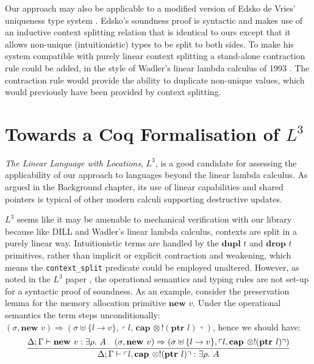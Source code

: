 \documentclass[]{unswthesis}
\newcommand{\Exists}[1]{\exists #1 \ldotp \,}
\newcommand{\types}{\vdash}
\newcommand{\steps}{\Rightarrow}
\newcommand{\ptr}[1]{\textbf{ptr $#1$}}
\newcommand{\capa}[1]{\textbf{cap $#1$}}
\newcommand{\lquine}{\left\ulcorner}
\newcommand{\rquine}{\right\urcorner}
\newcommand{\dupl}[1]{\textbf{dupl $#1$}}
\newcommand{\drop}[1]{\textbf{drop $#1$}}
\newcommand{\lnew}[1]{\textbf{new $#1$}}
\newcommand{\qpair}[2]{\lquine #1, #2 \rquine}
\let\c\texttt
\let\i\textit
\begin{document}
Our approach may also be applicable to a modified version of Edsko de Vries' uniqueness type system \cite{deVries07, deVriesPhD08}. Edsko's soundness proof is syntactic and makes use of an inductive context splitting relation that is identical to ours except that it allows non-unique (intuitionistic) types to be split to both sides. To make his system compatible with purely linear context splitting a stand-alone contraction rule could be added, in the style of Wadler's linear lambda calculus of 1993 \cite{wadler93}. The contraction rule would provide the ability to duplicate non-unique values, which would previously have been provided by context splitting.

\section{Towards a Coq Formalisation of $L^3$}
\label{towards-l3}

\i{The Linear Language with Locations}, $L^3$, is a good candidate for assessing the applicability of our approach to languages beyond the linear lambda calculus. As argued in the Background chapter, its use of linear capabilities and shared pointers is typical of other modern calculi supporting destructive updates.

$L^3$ seems like it may be amenable to mechanical verification with our library because like DILL and Wadler's linear lambda calculus, contexts are split in a purely linear way. Intuitionistic terms are handled by the $\dupl{t}$ and $\drop{t}$ primitives, rather than implicit or explicit contraction and weakening, which means the \c{context_split} predicate could be employed unaltered. However, as noted in the $L^3$ paper \cite{ahmed05}, the operational semantics and typing rules are not set-up for a syntactic proof of soundness. As an example, consider the preservation lemma for the memory allocation primitive $\lnew{v}$. Under the operational semantics the term steps unconditionally: $(\sigma, \lnew{v}) \steps (\sigma \uplus \{l \to v\}, \qpair{l}{\capa \otimes !(\ptr{l})})$, hence we should have:
\begin{eqnarray*}
\infer{\Delta; \Gamma \types \qpair{l}{\capa \otimes !(\ptr{l})} : \Exists{\rho} A}{
  \Delta; \Gamma \types \lnew{v} : \Exists{\rho} A  & (\sigma, \lnew{v}) \steps (\sigma \uplus \{l \to v\}, \qpair{l}{\capa \otimes !(\ptr{l})})
}
\end{eqnarray*}
\end{document}
